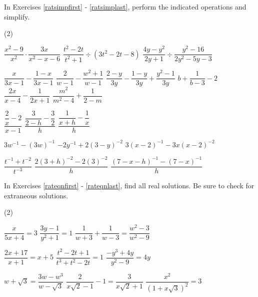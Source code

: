 \label{ExercisesforAppRatExpEqus}

In Exercises \ref{ratsimpfirst} - \ref{ratsimplast}, perform the indicated operations and simplify.

\begin{tasks}(2)

\task $\dfrac{x^2-9}{x^2} \cdot \dfrac{3x}{x^2-x-6}$\label{ratsimpfirst}
\task $\dfrac{t^2-2t}{t^2+1} \div (3t^2 - 2t - 8)$
\task $\dfrac{4y-y^2}{2y+1} \div \dfrac{y^2-16}{2y^2-5y-3}$

\task  $\dfrac{x}{3x-1} - \dfrac{1-x}{3x-1}$
\task  $\dfrac{2}{w-1} - \dfrac{w^2+1}{w-1}$
\task  $\dfrac{2-y}{3y} - \dfrac{1-y}{3y} + \dfrac{y^2-1}{3y}$
\task  $b+ \dfrac{1}{b-3} - 2$
\task  $\dfrac{2x}{x-4} - \dfrac{1}{2x+1}$
\task  $\dfrac{m^2}{m^2-4} + \dfrac{1}{2-m}$

\task $\dfrac{\dfrac{2}{x} - 2}{x-1}$
\task $\dfrac{\dfrac{3}{2-h} - \dfrac{3}{2}}{h}$
\task $\dfrac{\dfrac{1}{x+h} - \dfrac{1}{x}}{h}$


\task  $3w^{-1} - (3w)^{-1}$
\task  $-2y^{-1}  + 2(3-y)^{-2}$
\task  $3(x-2)^{-1} - 3x(x-2)^{-2}$

 
\task $\dfrac{t^{-1} + t^{-2}}{t^{-3}}$  
\task $\dfrac{2(3+h)^{-2} - 2(3)^{-2}}{h}$ 
\task $\dfrac{(7-x-h)^{-1} - (7-x)^{-1}}{h}$  \label{ratsimplast}

\end{tasks}

In Exercises \ref{rateqnfirst} - \ref{rateqnlast}, find all real solutions.  Be sure to check for extraneous solutions.

\begin{tasks}[resume](2)

\task $\dfrac{x}{5x + 4} = 3$ \label{rateqnfirst}
\task $\dfrac{3y - 1}{y^{2} + 1} = 1$
\task $\dfrac{1}{w + 3} + \dfrac{1}{w - 3} = \dfrac{w^{2} - 3}{w^{2} - 9}$


\task $\dfrac{2x + 17}{x + 1} = x + 5$
\task $\dfrac{t^{2} - 2t + 1}{t^{3} + t^{2} - 2t} = 1$
\task $\dfrac{-y^{3} + 4y}{y^{2} - 9} = 4y$  

\task $w + \sqrt{3} = \dfrac{3w - w^3}{w - \sqrt{3}}$
\task $\dfrac{2}{x\sqrt{2} - 1}  - 1 = \dfrac{3}{x \sqrt{2} + 1}$
\task $\dfrac{x^2}{(1 + x\sqrt{3})^2} = 3$ \label{rateqnlast}

\end{tasks}

